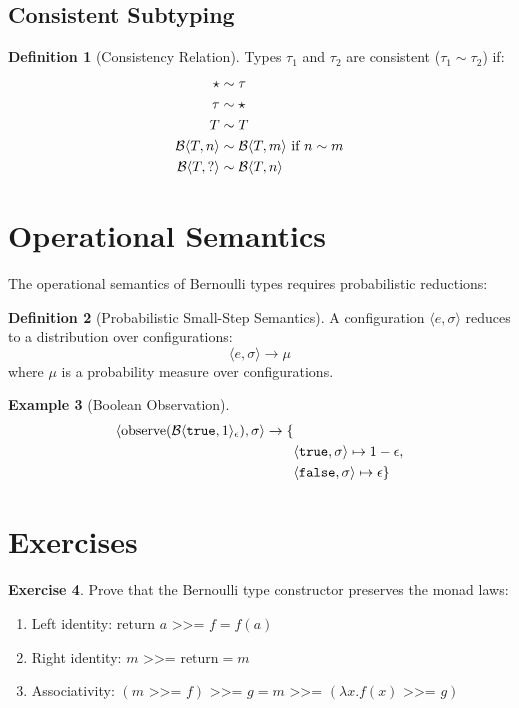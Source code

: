\documentclass[11pt,twoside,openright]{book}
\theoremstyle{definition}
\newtheorem{definition}{Definition}[chapter]
\newtheorem{example}[definition]{Example}
\newtheorem{exercise}[definition]{Exercise}
\theoremstyle{plain}
\theoremstyle{remark}
\begin{document}
\subsection{Consistent Subtyping}

\begin{definition}[Consistency Relation]
Types $\tau_1$ and $\tau_2$ are consistent ($\tau_1 \sim \tau_2$) if:
\begin{align}
\star &\sim \tau \\
\tau &\sim \star \\
T &\sim T \\
\mathcal{B}\langle T, n \rangle &\sim \mathcal{B}\langle T, m \rangle \text{ if } n \sim m \\
\mathcal{B}\langle T, ? \rangle &\sim \mathcal{B}\langle T, n \rangle
\end{align}
\end{definition}

\section{Operational Semantics}

The operational semantics of Bernoulli types requires probabilistic reductions:

\begin{definition}[Probabilistic Small-Step Semantics]
A configuration $\langle e, \sigma \rangle$ reduces to a distribution over configurations:
\begin{equation}
\langle e, \sigma \rangle \to \mu
\end{equation}
where $\mu$ is a probability measure over configurations.
\end{definition}

\begin{example}[Boolean Observation]
\begin{align}
\langle \text{observe}(\mathcal{B}\langle \mathtt{true}, 1 \rangle_\epsilon), \sigma \rangle \to \{&\\
    &\langle \mathtt{true}, \sigma \rangle \mapsto 1-\epsilon,\\
    &\langle \mathtt{false}, \sigma \rangle \mapsto \epsilon
\}
\end{align}
\end{example}

\section{Exercises}

\begin{exercise}
Prove that the Bernoulli type constructor preserves the monad laws:
\begin{enumerate}
    \item Left identity: $\text{return } a \text{ >>= } f = f(a)$
    \item Right identity: $m \text{ >>= return} = m$
    \item Associativity: $(m \text{ >>= } f) \text{ >>= } g = m \text{ >>= } (\lambda x. f(x) \text{ >>= } g)$
\end{enumerate}
\end{exercise}
\end{document}
